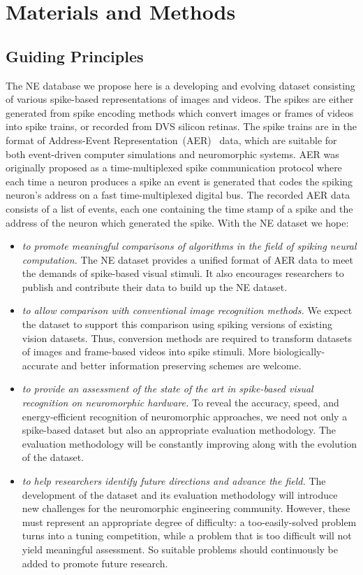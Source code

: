 \section{Materials and Methods}
\label{sec:method}
\subsection{Guiding Principles}
The NE database we propose here is a developing and evolving dataset consisting of various spike-based representations of images and videos.
The spikes are either generated from spike encoding methods which convert images or frames of videos into spike trains, or recorded from DVS silicon retinas.
The spike trains are in the format of Address-Event Representation~(AER)~\citep{mahowald1992vlsi} data, which are suitable for both event-driven computer simulations and neuromorphic systems.
AER was originally proposed as a time-multiplexed spike communication protocol where each time a neuron produces a spike an event is generated that codes the spiking neuron's address on a fast time-multiplexed digital bus.
The recorded AER data consists of a list of events, each one containing the time stamp of a spike and the address of the neuron which generated the spike.
With the NE dataset we hope:
\begin{itemize}
	\item \textit{to promote meaningful comparisons of algorithms in the field of spiking neural computation.}
	The NE dataset provides a unified format of AER data to meet the demands of spike-based visual stimuli.
	It also encourages researchers to publish and contribute their data to build up the NE dataset.
	\item \textit{to allow comparison with conventional image recognition methods.}
	We expect the dataset to support this comparison using spiking versions of existing vision datasets.
	Thus, conversion methods are required to transform datasets of images and frame-based videos into spike stimuli.
	More biologically-accurate and better information preserving schemes are welcome.
	
	\item \textit{to provide an assessment of the state of the art in spike-based visual recognition on neuromorphic hardware.}
	To reveal the accuracy, speed, and energy-efficient recognition of neuromorphic approaches, we need not only a spike-based dataset but also an appropriate evaluation methodology.
	The evaluation methodology will be constantly improving along with the evolution of the dataset.
	\item \textit{to help researchers identify future directions and advance the field.}
	The development of the dataset and its evaluation methodology will introduce new challenges for the neuromorphic engineering community.
	However, these must represent an appropriate degree of difficulty: a too-easily-solved problem turns into a tuning competition, while a problem that is too difficult will not yield meaningful assessment.
	So suitable problems should continuously be added to promote future research.  
\end{itemize}


